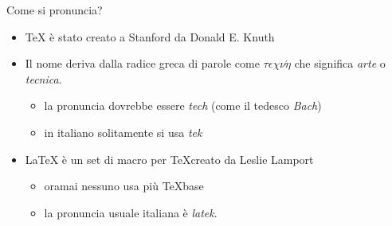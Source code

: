 \documentclass{beamer}
\begin{document}

\begin{frame}{Come si pronuncia?}

\begin{itemize}
\item \TeX{} \`e stato creato a Stanford da Donald E. Knuth
\item Il nome deriva dalla radice greca di parole come
\textbf{$\tau\epsilon\chi\nu\acute{\eta}$}
che significa \emph{arte} o \emph{tecnica}.
\begin{itemize}
\item la pronuncia dovrebbe essere \emph{tech} (come il tedesco \emph{Bach})
\item in italiano solitamente si usa \emph{tek}
\end{itemize}
\item \LaTeX{} \`e un set di macro per \TeX creato da Leslie Lamport

\begin{itemize}
\item oramai nessuno usa pi\`u \TeX base
\item la pronuncia usuale italiana \`e \emph{latek}.
\end{itemize}
\end{itemize}
\end{frame}

\end{document}
